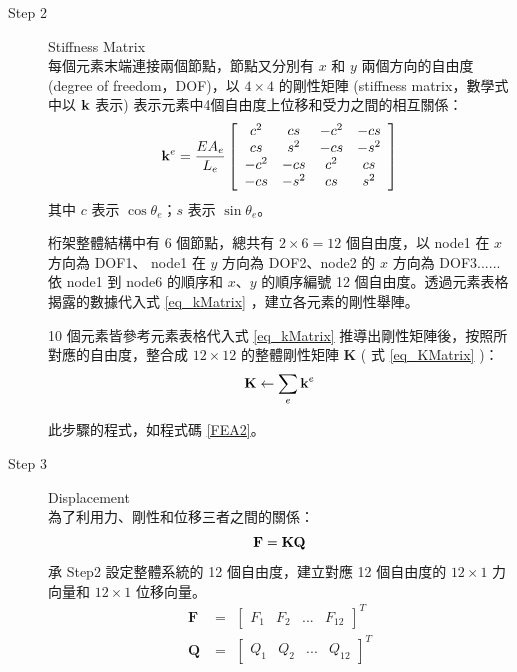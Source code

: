\documentclass[12pt]{article}
\numberwithin{figure}{section}
\numberwithin{table}{section}
\numberwithin{equation}{section}
\begin{document}
\begin{CJK}{UTF8}{bkai}
\begin{description}
        

	\item [Step 2] Stiffness Matrix\\
		每個元素末端連接兩個節點，節點又分別有 $x$ 和 $y$ 兩個方向的自由度 (degree of freedom，DOF)，以 $4\times4$ 的剛性矩陣 (stiffness matrix，數學式中以 ${\bf k}$ 表示) 表示元素中4個自由度上位移和受力之間的相互關係：
		\begin{equation}
		\label{eq_kMatrix}
		{\bf k}^e=\frac{EA_e}{L_e}
		\left[
		\begin{array}{cccc}
		c^2 & cs & -c^2 & -cs\\
		cs & s^2 & -cs &-s^2\\
		-c^2 & -cs & c^2 & cs\\
		-cs & -s^2 & cs & s^2
		\end{array}
		\right]
		\end{equation}
		其中 $c$ 表示 $\cos \theta_e$；$s$ 表示 $\sin \theta_e$。

		桁架整體結構中有 6 個節點，總共有 $2\times6=12$ 個自由度，以 node1 在 $x$ 方向為 DOF1、 node1 在 $y$ 方向為 DOF2、node2 的 $x$ 方向為 DOF3......依 node1 到 node6 的順序和 $x$、$y$ 的順序編號 12 個自由度。透過元素表格揭露的數據代入式 \ref{eq_kMatrix} ，建立各元素的剛性舉陣。


		10 個元素皆參考元素表格代入式 \ref{eq_kMatrix}  推導出剛性矩陣後，按照所對應的自由度，整合成 $12\times12$ 的整體剛性矩陣 $\textbf{K}$ ( 式 \ref{eq_KMatrix} )：
		\begin{equation}
		\label{eq_KMatrix}
		\textbf{K}\leftarrow \sum_{e} \textbf{k}^e\\
		\end{equation}

        此步驟的程式，如程式碼 \ref{FEA2}。\\
        

	\item [Step 3] Displacement\\
		為了利用力、剛性和位移三者之間的關係：
		\begin{equation}
			\label{eq_F=KQ}
			{\bf F}={\bf K}{\bf Q}
		\end{equation}
		承 Step2 設定整體系統的 12 個自由度，建立對應 12 個自由度的 $12\times1$ 力向量和 $12\times1$ 位移向量。
		\begin{align}
		\label{eq_forceVector}
			\textbf{F}&= \:\,
			\left[
			\begin{array}{cccc}
			F_1 & F_2 & ... & F_{12}
			\end{array}
			\right]^T\\
		\label{eq_displacementVector}
			\textbf{Q}&= \:\,
			\left[
			\begin{array}{cccc}
			Q_1 & Q_2 & ... & Q_{12}
			\end{array}
			\right]^T
		\end{align}


\end{description}
\end{CJK}
\end{document}
